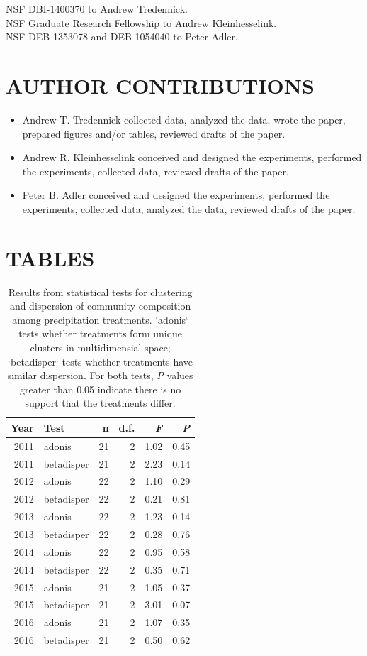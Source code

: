 \documentclass[fleqn,10pt,lineno]{wlpeerj} %
\begin{document}
NSF DBI-1400370 to Andrew Tredennick.\\
NSF Graduate Research Fellowship to Andrew Kleinhesselink.\\
NSF DEB-1353078 and DEB-1054040 to Peter Adler.

\section{AUTHOR CONTRIBUTIONS}\label{author-contributions}

\begin{itemize}
  \item Andrew T. Tredennick collected data, analyzed the data, wrote the paper, prepared figures and/or tables, reviewed
drafts of the paper.
  \item Andrew R. Kleinhesselink conceived and designed the experiments, performed the experiments, collected data, reviewed drafts of the paper.
  \item Peter B. Adler conceived and designed the experiments, performed the experiments, collected data, analyzed the data, reviewed
drafts of the paper.
\end{itemize}

\newpage{}

\section{TABLES}\label{tables}

\begin{table}[ht]
\centering
\caption{Results from statistical tests for clustering and dispersion of community composition among precipitation treatments. `adonis` tests whether treatments form unique clusters in multidimensial space; `betadisper` tests whether treatments have similar dispersion. For both tests, \emph{P} values greater than 0.05 indicate there is no support that the treatments differ.} 
\begingroup\normalsize
\begin{tabular}{rlrrrr}
  \hline
Year & Test & n & d.f. & \emph{F} & \emph{P} \\ 
  \hline
2011 & adonis &  21 &   2 & 1.02 & 0.45 \\ 
  2011 & betadisper &  21 &   2 & 2.23 & 0.14 \\ 
  2012 & adonis &  22 &   2 & 1.10 & 0.29 \\ 
  2012 & betadisper &  22 &   2 & 0.21 & 0.81 \\ 
  2013 & adonis &  22 &   2 & 1.23 & 0.14 \\ 
  2013 & betadisper &  22 &   2 & 0.28 & 0.76 \\ 
  2014 & adonis &  22 &   2 & 0.95 & 0.58 \\ 
  2014 & betadisper &  22 &   2 & 0.35 & 0.71 \\ 
  2015 & adonis &  21 &   2 & 1.05 & 0.37 \\ 
  2015 & betadisper &  21 &   2 & 3.01 & 0.07 \\ 
  2016 & adonis &  21 &   2 & 1.07 & 0.35 \\ 
  2016 & betadisper &  21 &   2 & 0.50 & 0.62 \\ 
   \hline
\end{tabular}
\endgroup
\end{table}
\end{document}

